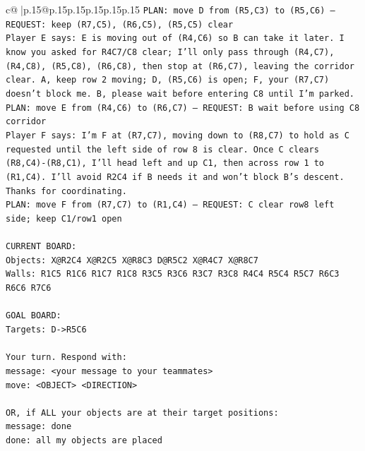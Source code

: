 \documentclass{article}
\begin{document}
{\begin{supertabular}{c@{$\;$}|p{.15\linewidth}@{}p{.15\linewidth}p{.15\linewidth}p{.15\linewidth}p{.15\linewidth}p{.15\linewidth}}
{{{\texttt{PLAN: move D from (R5,C3) to (R5,C6) — REQUEST: keep (R7,C5), (R6,C5), (R5,C5) clear} \\
\texttt{Player E says: E is moving out of (R4,C6) so B can take it later. I know you asked for R4C7/C8 clear; I'll only pass through (R4,C7), (R4,C8), (R5,C8), (R6,C8), then stop at (R6,C7), leaving the corridor clear. A, keep row 2 moving; D, (R5,C6) is open; F, your (R7,C7) doesn't block me. B, please wait before entering C8 until I'm parked. PLAN: move E from (R4,C6) to (R6,C7) — REQUEST: B wait before using C8 corridor} \\
\texttt{Player F says: I'm F at (R7,C7), moving down to (R8,C7) to hold as C requested until the left side of row 8 is clear. Once C clears (R8,C4){-}(R8,C1), I'll head left and up C1, then across row 1 to (R1,C4). I'll avoid R2C4 if B needs it and won't block B's descent. Thanks for coordinating.} \\
\texttt{PLAN: move F from (R7,C7) to (R1,C4) — REQUEST: C clear row8 left side; keep C1/row1 open} \\
\\ 
\texttt{CURRENT BOARD:} \\
\texttt{Objects: X@R2C4 X@R2C5 X@R8C3 D@R5C2 X@R4C7 X@R8C7} \\
\texttt{Walls: R1C5 R1C6 R1C7 R1C8 R3C5 R3C6 R3C7 R3C8 R4C4 R5C4 R5C7 R6C3 R6C6 R7C6} \\
\\ 
\texttt{GOAL BOARD:} \\
\texttt{Targets: D{-}>R5C6} \\
\\ 
\texttt{Your turn. Respond with:} \\
\texttt{message: <your message to your teammates>} \\
\texttt{move: <OBJECT> <DIRECTION>} \\
\\ 
\texttt{OR, if ALL your objects are at their target positions:} \\
\texttt{message: done} \\
\texttt{done: all my objects are placed} \\
            }
        }
    }
     \\ \\


\end{supertabular}}
\end{document}
